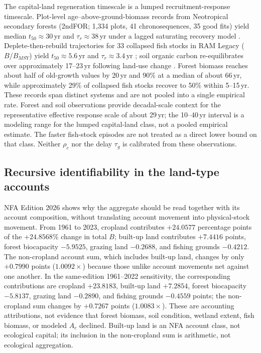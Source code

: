 \documentclass[11pt,a4paper]{article}
\begin{document}
The capital-land regeneration timescale is a lumped recruitment-response timescale. Plot-level age--above-ground-biomass records from Neotropical secondary forests (2ndFOR; 1,334 plots, 41 chronosequences, 35 good fits) yield median $t_{50}\approx30$\,yr and $\tau_r\approx38$\,yr under a lagged saturating recovery model \citep{Poorter2016}. Deplete-then-rebuild trajectories for 33 collapsed fish stocks in RAM Legacy ($B/B_{MSY}$) yield $t_{50}\approx5.6$\,yr and $\tau_r\approx3.4$\,yr \citep{HutchingsReynolds2004,Neubauer2013}; soil organic carbon re-equilibrates over approximately 17--23\,yr following land-use change \citep{Poeplau2011}. Forest biomass reaches about half of old-growth values by 20\,yr and 90\% at a median of about 66\,yr, while approximately 29\% of collapsed fish stocks recover to 50\% within 5--15\,yr. These records span distinct systems and are not pooled into a single empirical rate. Forest and soil observations provide decadal-scale context for the representative effective response scale of about 29\,yr; the 10--40\,yr interval is a modeling range for the lumped capital-land class, not a pooled empirical estimate. The faster fish-stock episodes are not treated as a direct lower bound on that class. Neither $\rho_c$ nor the delay $\tau_g$ is calibrated from these observations.

\subsection{Recursive identifiability in the land-type accounts}\label{si:recursive}

NFA Edition 2026 shows why the aggregate should be read together with its account composition, without translating account movement into physical-stock movement. From 1961 to 2023, cropland contributes $+24.0577$ percentage points of the $+24.8568\%$ change in total $B$; built-up land contributes $+7.4416$ points, forest biocapacity $-5.9525$, grazing land $-0.2688$, and fishing grounds $-0.4212$. The non-cropland account sum, which includes built-up land, changes by only $+0.7990$ points ($1.0092\times$) because those unlike account movements net against one another. In the same-edition 1961--2022 sensitivity, the corresponding contributions are cropland $+23.8183$, built-up land $+7.2854$, forest biocapacity $-5.8137$, grazing land $-0.2890$, and fishing grounds $-0.4559$ points; the non-cropland sum changes by $+0.7267$ points ($1.0083\times$). These are accounting attributions, not evidence that forest biomass, soil condition, wetland extent, fish biomass, or modeled $A_c$ declined. Built-up land is an NFA account class, not ecological capital; its inclusion in the non-cropland sum is arithmetic, not ecological aggregation.
\end{document}
